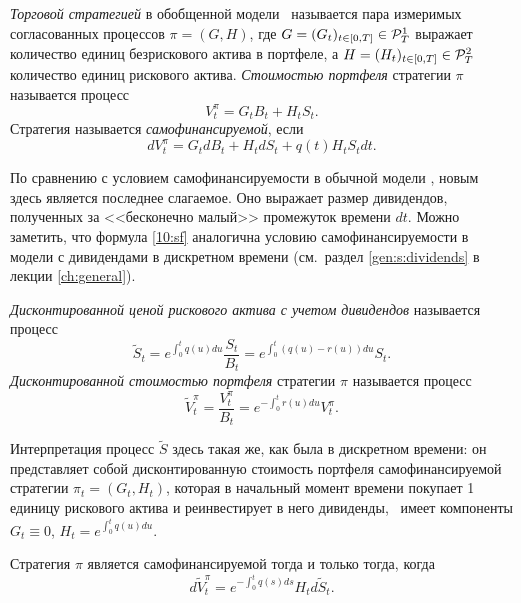 \begin{definition}
\emph{Торговой стратегией} в обобщенной модели \bs\ называется пара измеримых согласованных процессов $\pi=(G,H)$, где $G=(G_t)_{t\in[0,T]} \in \mathcal{P}^1_T$ выражает количество единиц безрискового актива в портфеле, а $H=(H_t)_{t\in[0,T]} \in \mathcal{P}^2_T$ количество единиц рискового актива. 
\emph{Стоимостью портфеля} стратегии $\pi$ называется процесс 
\[
V_t^\pi = G_t B_t + H_t S_t.
\]
Стратегия называется \emph{самофинансируемой}, если 
\begin{equation}
\label{10:sf}
d V_t^\pi = G_t d B_t + H_t d S_t + q(t) H_t S_t dt.
\end{equation}
\end{definition}

По сравнению с условием самофинансируемости в обычной модели \bs, новым здесь является последнее слагаемое.
Оно выражает размер дивидендов, полученных за <<бесконечно малый>> промежуток времени $dt$.
Можно заметить, что формула \eqref{10:sf} аналогична условию самофинансируемости в модели с дивидендами в дискретном времени (см.\ раздел \ref{gen:s:dividends} в лекции \ref{ch:general}).

\begin{definition}
\emph{Дисконтированной ценой рискового актива с учетом дивидендов} называется процесс 
\[
\tilde S_t = e^{\int_0^t q(u) du} \frac{S_t}{B_t} = e^{\int_0^t (q(u)-r(u)) du} S_t.
\]
\emph{Дисконтированной стоимостью портфеля} стратегии $\pi$ называется процесс 
\[
\tilde V_t^\pi = \frac{V_t^\pi}{B_t} = e^{-\int_0^t r(u) du} V_t^\pi.
\]
\end{definition}

Интерпретация процесс $\tilde S$ здесь такая же, как была в дискретном времени: он представляет собой дисконтированную стоимость портфеля самофинансируемой стратегии $\pi_t=(G_t,H_t)$, которая в начальный момент времени покупает 1 единицу рискового актива и реинвестирует в него дивиденды, \te\ имеет компоненты $G_t\equiv 0$, $H_t = e^{\int_0^t q(u) du}$.

\begin{proposition}
\label{10:p:sf}
Стратегия $\pi$ является самофинансируемой тогда и только тогда, когда
\begin{equation}
\label{10:sf-discounted}
d\tilde V_t^\pi = e^{-\int_0^t q(s)ds} H_t d \tilde S_t.
\end{equation}
\end{proposition}

